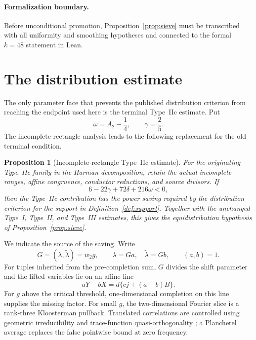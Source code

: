 \documentclass[11pt]{amsart}
\newtheorem{proposition}[theorem]{Proposition}
\theoremstyle{definition}
\begin{document}
\paragraph{Formalization boundary.}
Before unconditional promotion, Proposition~\ref{prop:sieve} must be
transcribed with all uniformity and smoothing hypotheses and connected to the
formal $k=48$ statement in Lean.

\section{The distribution estimate}\label{sec:distribution}

The only parameter face that prevents the published distribution criterion
from reaching the endpoint used here is the terminal Type~IIc estimate.  Put
\[
  \omega=A_2-\frac14,
  \qquad \gamma=\frac25.
\]
The incomplete-rectangle analysis leads to the following replacement for the
old terminal condition.

\begin{proposition}[Incomplete-rectangle Type~IIc estimate]
\label{prop:distribution}
For the originating Type~IIc family in the Harman decomposition, retain the
actual incomplete ranges, affine congruence, conductor reductions, and source
divisors.  If
\begin{equation}\label{eq:typeiic}
  6-22\gamma+72\delta+216\omega<0,
\end{equation}
then the Type~IIc contribution has the power saving required by the
distribution criterion for the support in Definition~\ref{def:support}.
Together with the unchanged Type~I, Type~II, and Type~III estimates, this gives
the equidistribution hypothesis of Proposition~\ref{prop:sieve}.
\end{proposition}

We indicate the source of the saving.  Write
\[
 G=(\lambda,\widetilde\lambda)=w_2g,
 \qquad \lambda=Ga,\quad\widetilde\lambda=Gb,
 \qquad (a,b)=1.
\]
For tuples inherited from the pre-completion sum, $G$ divides the shift
parameter and the lifted variables lie on an affine line
\[
  aY-bX=d\{cj+(a-b)B\}.
\]
For $g$ above the critical threshold, one-dimensional completion on this line
supplies the missing factor.  For small $g$, the two-dimensional Fourier slice
is a rank-three Kloosterman pullback.  Translated correlations are controlled
using geometric irreducibility and trace-function quasi-orthogonality
\cite{Katz1988,FKM2017}; a Plancherel average replaces the false pointwise
bound at zero frequency.
\end{document}
